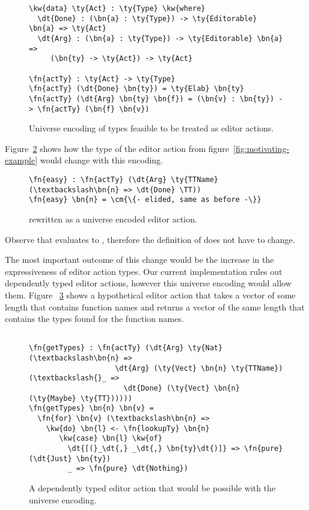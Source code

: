 \begin{figure}[b]
\begin{Verbatim}
\kw{data} \ty{Act} : \ty{Type} \kw{where}
  \dt{Done} : (\bn{a} : \ty{Type}) -> \ty{Editorable} \bn{a} => \ty{Act}
  \dt{Arg} : (\bn{a} : \ty{Type}) -> \ty{Editorable} \bn{a} =>
     (\bn{ty} -> \ty{Act}) -> \ty{Act}

\fn{actTy} : \ty{Act} -> \ty{Type}
\fn{actTy} (\dt{Done} \bn{ty}) = \ty{Elab} \bn{ty}
\fn{actTy} (\dt{Arg} \bn{ty} \bn{f}) = (\bn{v} : \bn{ty}) -> \fn{actTy} (\bn{f} \bn{v})
\end{Verbatim}
\caption{Universe encoding of types feasible to be treated as editor actions.}
\label{code:universe}
\end{figure}

Figure~\ref{code:universe-example} shows how the type of the  editor
action from figure~\ref{fig:motivating-example} would change with this encoding.

\begin{figure}
\begin{Verbatim}
\fn{easy} : \fn{actTy} (\dt{Arg} \ty{TTName} (\textbackslash\bn{n} => \dt{Done} \TT))
\fn{easy} \bn{n} = \cm{\{- elided, same as before -\}}
\end{Verbatim}
\caption{ rewritten as a universe encoded editor action.}
\label{code:universe-example}
\end{figure}

Observe that  evaluates
to , therefore the definition of  does
not have to change.

The most important outcome of this change would be the increase in the
expressiveness of editor action types. Our current implementation rules out
dependently typed editor actions, however this universe encoding would allow
them. Figure ~\ref{code:universe-dependent} shows a
hypothetical editor action that takes a vector of some length that contains
function names and returns a vector of the same length that contains the types
found for the function names.

\begin{figure}
\begin{Verbatim}

\fn{getTypes} : \fn{actTy} (\dt{Arg} \ty{Nat} (\textbackslash\bn{n} =>
                    \dt{Arg} (\ty{Vect} \bn{n} \ty{TTName}) (\textbackslash{}_ =>
                      \dt{Done} (\ty{Vect} \bn{n} (\ty{Maybe} \ty{TT})))))
\fn{getTypes} \bn{n} \bn{v} =
  \fn{for} \bn{v} (\textbackslash\bn{n} =>
    \kw{do} \bn{l} <- \fn{lookupTy} \bn{n}
       \kw{case} \bn{l} \kw{of}
         \dt{[(}_\dt{,} _\dt{,} \bn{ty}\dt{)]} => \fn{pure} (\dt{Just} \bn{ty})
         _ => \fn{pure} \dt{Nothing})
\end{Verbatim}
\caption{A dependently typed editor action that would be possible with the universe encoding.}
\label{code:universe-dependent}
\end{figure}

